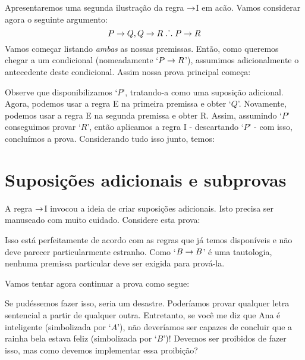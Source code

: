 Apresentaremos uma segunda ilustra\c c\~ao da regra $\rightarrow$I em ac\~ao. Vamos considerar  agora o seguinte argumento:
	$$P \rightarrow Q, Q \rightarrow R \mathrel{\ldotp\dot{}\,\ldotp} P \rightarrow R$$
Vamos come\c car listando \emph{ambas} as nossas premissas. Ent\~ao, como queremos chegar a um condicional (nomeadamente `$P \rightarrow R$'),  assumimos adicionalmente o antecedente deste condicional. Assim nossa prova principal come\c ca: 

\begin{fitchproof}
	\open
	\close
\end{fitchproof}
Observe que disponibilizamos `$P$',  tratando-a como uma suposi\c c\~ao adicional.  
Agora, podemos usar a regra  {\eif}E na primeira premissa e obter `$Q$'. Novamente, podemos usar  a regra {\eif}E na segunda premissa e obter R. Assim, assumindo `$P$'  conseguimos provar `$R$',   ent\~ao aplicamos a regra {\eif}I  - descartando `$P$' - com isso, conclu\'imos a prova.  Considerando tudo isso junto, temos: 


\label{HSproof}
\begin{fitchproof}
	\open
	\close
\end{fitchproof}


\section{Suposi\c c\~oes adicionais  e subprovas}
A regra $\rightarrow$I invocou a ideia de criar  suposi\c c\~oes adicionais.   Isto precisa ser manuseado com muito cuidado. Considere esta prova:
\begin{fitchproof}
	\open
		 
	\close
\end{fitchproof}
Isso est\'a perfeitamente de acordo com as regras  que j\'a temos dispon\'iveis e n\~ao deve parecer particularmente estranho.   Como `$B \rightarrow B$'  \'e uma tautologia, nenhuma premissa particular deve ser exigida para prov\'a-la.

Vamos tentar agora continuar a prova como segue: 


\begin{fitchproof}
	\open
		 
	\close
	 
	 
\end{fitchproof}
Se pud\'essemos fazer isso, seria um desastre. Poder\'iamos provar qualquer  letra sentencial a partir de qualquer outra. Entretanto, se  voc\^e me diz que Ana \'e inteligente  (simbolizada por `$A$'),  n\~ao dever\'iamos ser capazes de concluir que a rainha bela estava feliz (simbolizada por `$B$')!   Devemos ser proibidos de fazer isso, mas como devemos implementar essa proibi\c c\~ao?

